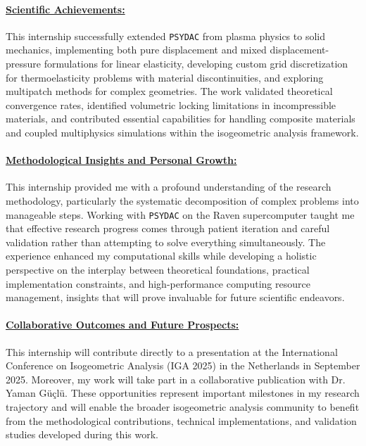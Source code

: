 \documentclass[a4paper,12pt,twoside]{report}
\begin{document}
\paragraph{\underline{Scientific Achievements:}}
This internship successfully extended \texttt{PSYDAC} from plasma physics to solid mechanics, implementing both pure displacement and mixed displacement-pressure formulations for linear elasticity, developing custom grid discretization for thermoelasticity problems with material discontinuities, and exploring multipatch methods for complex geometries. The work validated theoretical convergence rates, identified volumetric locking limitations in incompressible materials, and contributed essential capabilities for handling composite materials and coupled multiphysics simulations within the isogeometric analysis framework.

\paragraph{\underline{Methodological Insights and Personal Growth:}}

This internship provided me with a profound understanding of the research methodology, particularly the systematic decomposition of complex problems into manageable steps. Working with \texttt{PSYDAC} on the Raven supercomputer taught me that effective research progress comes through patient iteration and careful validation rather than attempting to solve everything simultaneously. The experience enhanced my computational skills while developing a holistic perspective on the interplay between theoretical foundations, practical implementation constraints, and high-performance computing resource management, insights that will prove invaluable for future scientific endeavors.


\paragraph{\underline{Collaborative Outcomes and Future Prospects:}}

This internship will contribute directly to a presentation at the International Conference on Isogeometric Analysis (IGA 2025) in the Netherlands in September 2025. Moreover, my work will take part in a collaborative publication with Dr. Yaman Güçlü. These opportunities represent important milestones in my research trajectory and will enable the broader isogeometric analysis community to benefit from the methodological contributions, technical implementations, and validation studies developed during this work.
\end{document}
